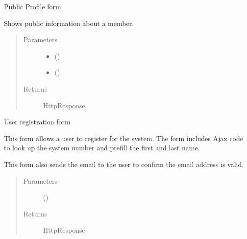 \documentclass[letterpaper,10pt,english]{sphinxmanual}
\begin{document}

\begin{fulllineitems}
\label{\detokenize{accounts:accounts.views.public_profile}}
Public Profile form.

Shows public information about a member.
\begin{quote}\begin{description}
\item[{Parameters}] \leavevmode\begin{itemize}
\item {} 
 () \textendash{} 

\item {} 
 () \textendash{} 

\end{itemize}

\item[{Returns}] \leavevmode
HttpResponse

\end{description}\end{quote}

\end{fulllineitems}


\begin{fulllineitems}
\label{\detokenize{accounts:accounts.views.register}}
User registration form

This form allows a user to register for the system. The form includes
Ajax code to look up the system number and pre\sphinxhyphen{}fill the first and last name.

This form also sends the email to the user to confirm the email address
is valid.
\begin{quote}\begin{description}
\item[{Parameters}] \leavevmode
{} () \textendash{} 

\item[{Returns}] \leavevmode
HttpResponse

\end{description}\end{quote}

\end{fulllineitems}
\end{document}
